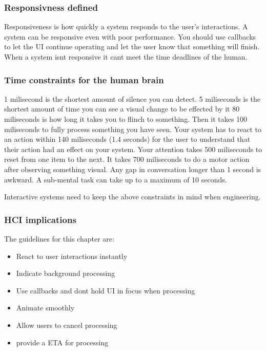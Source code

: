 \documentclass[11pt,]{article}
\providecommand{\tightlist}{%
  \setlength{\itemsep}{0pt}\setlength{\parskip}{0pt}}
\begin{document}
\hypertarget{responsivness-defined}{%
\subsubsection{Responsivness defined}\label{responsivness-defined}}

Responsiveness is how quickly a system responds to the user's
interactions. A system can be responsive even with poor performance. You
should use callbacks to let the UI continue operating and let the user
know that something will finish. When a system isnt responsive it cant
meet the time deadlines of the human.

\hypertarget{time-constraints-for-the-human-brain}{%
\subsubsection{Time constraints for the human
brain}\label{time-constraints-for-the-human-brain}}

1 milisecond is the shortest amount of silence you can detect. 5
miliseconds is the shortest amount of time you can see a visual change
to be effected by it 80 miliseconds is how long it takes you to flinch
to something. Then it takes 100 miliseconds to fully process something
you have seen. Your system has to react to an action within 140
miliseconds (1.4 seconds) for the user to understand that their action
had an effect on your system. Your attention takes 500 miliseconds to
reset from one item to the next. It takes 700 miliseconds to do a motor
action after observing something visual. Any gap in conversation longer
than 1 second is awkward. A sub-mental task can take up to a maximum of
10 seconds.

Interactive systems need to keep the above constraints in mind when
engineering.

\hypertarget{hci-implications}{%
\subsubsection{HCI implications}\label{hci-implications}}

The guidelines for this chapter are:

\begin{itemize}
\tightlist
\item
  React to user interactions instantly
\item
  Indicate background processing
\item
  Use callbacks and dont hold UI in focus when processing
\item
  Animate smoothly
\item
  Allow users to cancel processing
\item
  provide a ETA for processing
\end{itemize}
\end{document}
